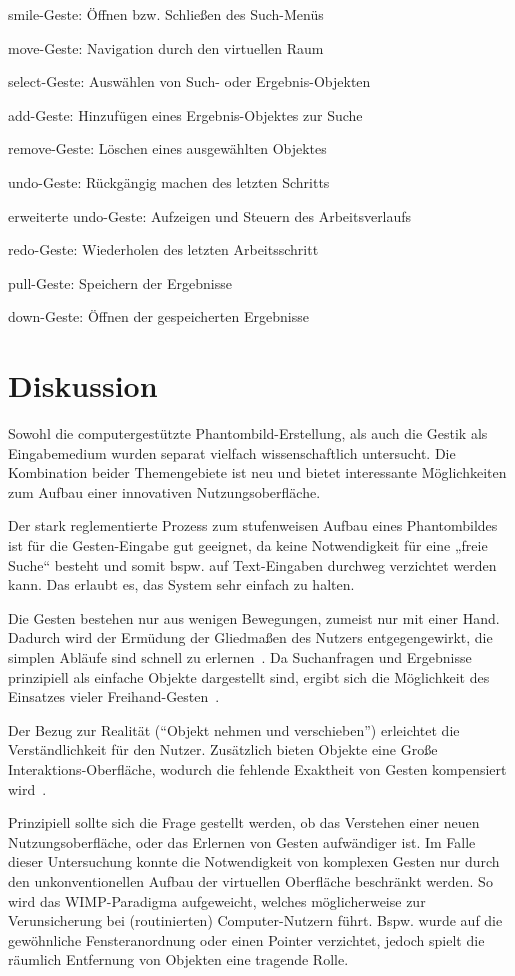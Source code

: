 \documentclass{sigchi-ext}
\begin{document}
smile-Geste: Öffnen bzw. Schließen des Such-Menüs

move-Geste: Navigation durch den virtuellen Raum

select-Geste: Auswählen von Such- oder Ergebnis-Objekten

add-Geste: Hinzufügen eines Ergebnis-Objektes zur Suche

remove-Geste: Löschen eines ausgewählten Objektes

undo-Geste: Rückgängig machen des letzten Schritts

erweiterte undo-Geste: Aufzeigen und Steuern des Arbeitsverlaufs 

redo-Geste: Wiederholen des letzten Arbeitsschritt

pull-Geste: Speichern der Ergebnisse

down-Geste: Öffnen der gespeicherten Ergebnisse

\section{Diskussion}
Sowohl die computergestützte Phantombild-Erstellung, als auch die
Gestik als Eingabemedium wurden separat vielfach wissenschaftlich
untersucht. Die Kombination beider Themengebiete ist neu und bietet
interessante Möglichkeiten zum Aufbau einer innovativen
Nutzungsoberfläche. 

Der stark reglementierte Prozess zum stufenweisen Aufbau eines
Phantombildes ist für die Gesten-Eingabe gut geeignet, da keine
Notwendigkeit für eine „freie Suche“ besteht und somit bspw. auf
Text-Eingaben durchweg verzichtet werden kann. Das erlaubt es, das
System sehr einfach zu halten.

Die Gesten bestehen nur aus wenigen Bewegungen, zumeist nur mit einer
Hand. Dadurch wird der Ermüdung der Gliedmaßen des Nutzers
entgegengewirkt, die simplen Abläufe sind schnell zu
erlernen~\cite{vrs:book}. 
Da Suchanfragen und Ergebnisse prinzipiell
als einfache Objekte dargestellt sind, ergibt sich die Möglichkeit des
Einsatzes vieler Freihand-Gesten~\cite{3dinteraction:book}. 

Der Bezug zur Realität (``Objekt nehmen und verschieben'') erleichtet die
Verständlichkeit für den Nutzer. Zusätzlich bieten Objekte eine Große
Interaktions-Oberfläche, wodurch die fehlende Exaktheit von Gesten
kompensiert wird~\cite{vrs:book}.

Prinzipiell sollte sich die Frage gestellt werden, ob das Verstehen
einer neuen Nutzungsoberfläche, oder das Erlernen von Gesten
aufwändiger ist. 
Im Falle dieser Untersuchung konnte die Notwendigkeit
von komplexen Gesten nur durch den unkonventionellen Aufbau der
virtuellen Oberfläche beschränkt werden. So wird das WIMP-Paradigma
aufgeweicht, welches möglicherweise zur Verunsicherung bei (routinierten)
Computer-Nutzern führt. Bspw. wurde auf die gewöhnliche
Fensteranordnung oder einen Pointer verzichtet, jedoch spielt die
räumlich Entfernung von Objekten eine tragende Rolle. 
\end{document}
